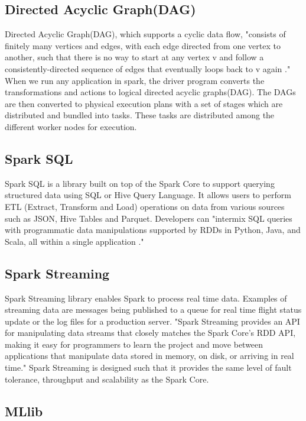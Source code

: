 \documentclass[9pt,twocolumn,twoside]{styles/osajnl}
\newcommand{\TODO}[2][]{\todo[color=red!10,inline,#1]{#2}}
\newcommand{\CE}{\TODO{Citation}}
\begin{document}
\subsection{Directed Acyclic Graph(DAG)}

Directed Acyclic Graph(DAG), which supports a cyclic data flow, "consists of finitely many vertices and edges, with each edge directed from one vertex to another, such that there is no way to start at any vertex v and follow a consistently-directed sequence of edges that eventually loops back to v again \cite{wiki-DAG}." \CE When we run any application in spark, the driver program converts the transformations and actions to logical directed acyclic graphs(DAG). The DAGs are then converted to physical execution plans with a set of stages which are distributed and bundled into tasks. These tasks are distributed among the different worker nodes for execution.

\subsection{Spark SQL}

Spark SQL\cite{book-spark} is a library built on top of the Spark Core to support
querying structured data using SQL or Hive Query Language. It allows
users to perform ETL (Extract, Transform and Load) operations on data
from various sources such as JSON, Hive Tables and Parquet. Developers
can "intermix SQL queries with programmatic data manipulations
supported by RDDs in Python, Java, and Scala, all within a single
application \cite{book-spark}."

\subsection{Spark Streaming}

Spark Streaming \cite{book-spark} library enables Spark to process real time
data. Examples of streaming data are messages being published to a
queue for real time flight status update or the log files for a
production server. "Spark Streaming provides an API for manipulating
data streams that closely matches the Spark Core’s RDD API, making it
easy for programmers to learn the project and move between
applications that manipulate data stored in memory, on disk, or
arriving in real time." Spark Streaming is designed such that it
provides the same level of fault tolerance, throughput and scalability
as the Spark Core.

\subsection{MLlib}
\end{document}
